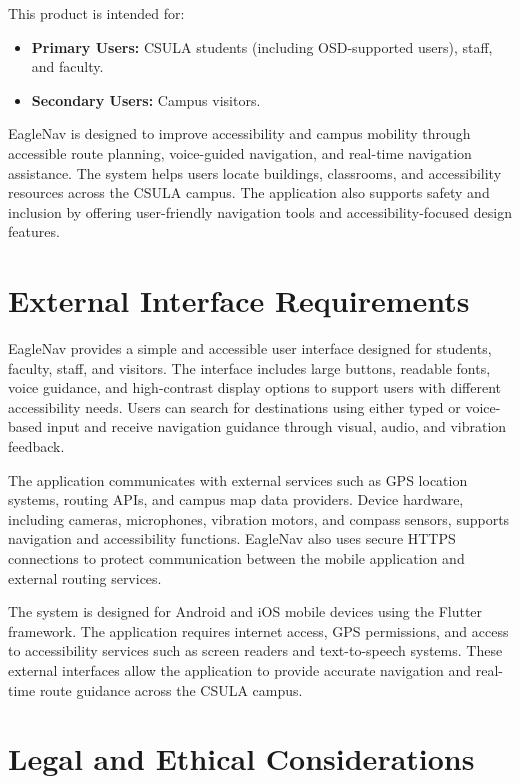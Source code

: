 \documentclass[12pt]{article}
\begin{document}
This product is intended for:

\begin{itemize}
    \item \textbf{Primary Users:} CSULA students (including OSD-supported users), staff, and faculty.
    \item \textbf{Secondary Users:} Campus visitors.
\end{itemize}

EagleNav is designed to improve accessibility and campus mobility through accessible route planning, voice-guided navigation, and real-time navigation assistance. The system helps users locate buildings, classrooms, and accessibility resources across the CSULA campus. The application also supports safety and inclusion by offering user-friendly navigation tools and accessibility-focused design features.

\section{External Interface Requirements}

EagleNav provides a simple and accessible user interface designed for students, faculty, staff, and visitors. The interface includes large buttons, readable fonts, voice guidance, and high-contrast display options to support users with different accessibility needs. Users can search for destinations using either typed or voice-based input and receive navigation guidance through visual, audio, and vibration feedback.

The application communicates with external services such as GPS location systems, routing APIs, and campus map data providers. Device hardware, including cameras, microphones, vibration motors, and compass sensors, supports navigation and accessibility functions. EagleNav also uses secure HTTPS connections to protect communication between the mobile application and external routing services.

The system is designed for Android and iOS mobile devices using the Flutter framework. The application requires internet access, GPS permissions, and access to accessibility services such as screen readers and text-to-speech systems. These external interfaces allow the application to provide accurate navigation and real-time route guidance across the CSULA campus.

\section{Legal and Ethical Considerations}
\end{document}
